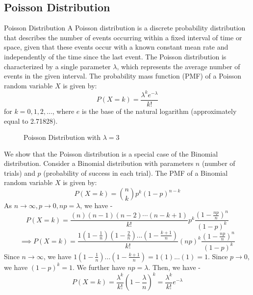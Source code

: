 \documentclass[openany]{book}
\begin{document}
\subsection{Poisson Distribution}
\begin{mydefinition}{Poisson Distribution}
    A Poisson distribution is a discrete probability distribution that describes the number of events occurring within a fixed interval of time or space, given that these events occur with a known constant mean rate and independently of the time since the last event. The Poisson distribution is characterized by a single parameter $\lambda$, which represents the average number of events in the given interval. The probability mass function (PMF) of a Poisson random variable $X$ is given by:
    $$P(X = k) = \frac{\lambda^k e^{-\lambda}}{k!}$$
    for $k = 0, 1, 2, \ldots$, where $e$ is the base of the natural logarithm (approximately equal to 2.71828).
\end{mydefinition}
\begin{figure}[H]
    \centering
    \caption{Poisson Distribution with $\lambda = 3$}
\end{figure}
We show that the Poisson distribution is a special case of the Binomial distribution. Consider a Binomial distribution with parameters $n$ (number of trials) and $p$ (probability of success in each trial). The PMF of a Binomial random variable $X$ is given by:
$$P(X = k) = \binom{n}{k} p^k (1 - p)^{n - k}$$
As $n\to \infty, p \to 0, np = \lambda$, we have - 
$$P(X=k) = \frac{(n)(n-1)(n-2)\cdots(n-k+1)}{k!} p^k \frac{(1 - \frac{np}{n})^{n}}{(1-p)^k}$$
$$\implies P(X=k) = \frac{1(1-\frac{1}{n})(1-\frac{2}{n})...(1-\frac{k+1}{n})}{k!}(np)^k\frac{(1 - \frac{np}{n})^n}{(1-p)^k}$$
Since $n\to \infty$, we have $1(1-\frac{1}{n})...(1 - \frac{k+1}{n}) = 1(1)...(1) = 1$. Since $p\to 0$, we have $(1-p)^k = 1$. We further have $np = \lambda$. Then, we have -  
$$P(X=k) = \frac{\lambda^k}{k!}(1-\frac{\lambda}{n})^k = \frac{\lambda^k}{k!}e^{-\lambda}$$
\end{document}
